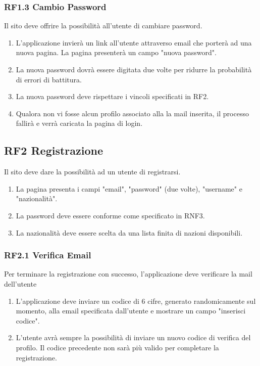 \documentclass{report}
\begin{document}
\subsubsection*{RF1.3 Cambio Password}
Il sito deve offrire la possibilità all’utente di cambiare password.
	\begin{enumerate}
		\item L'applicazione invierà un link all'utente attraverso email che porterà ad una nuova pagina. La pagina presenterà un campo "nuova password".
		
		\item La nuova password dovrà essere digitata due volte per ridurre la probabilità di errori di battitura.
		
		\item La nuova password deve rispettare i vincoli specificati in RF2.
		
		\item Qualora non vi fosse alcun profilo associato alla la mail inserita, il processo fallirà e verrà caricata la pagina di login.
	\end{enumerate}


\subsection*{RF2 Registrazione}
Il sito deve dare la possibilità ad un utente di registrarsi.
\begin{enumerate}
	\item La pagina presenta i campi "email", "password" (due volte), "username" e "nazionalità". 
	\item La password deve essere conforme come specificato in RNF3.
	\item La nazionalità deve essere scelta da una lista finita di nazioni disponibili.
\end{enumerate}

\subsubsection*{RF2.1 Verifica Email}
Per terminare la registrazione con successo, l'applicazione deve verificare la mail dell'utente

\begin{enumerate}
	\item L'applicazione deve inviare un codice di 6 cifre, generato randomicamente sul momento, alla email specificata dall’utente e mostrare un campo "inserisci codice".
		
	\item L’utente avrà sempre la possibilità di inviare un nuovo codice di verifica del profilo. Il codice precedente non sarà più valido per completare la registrazione.
		
\end{enumerate}
\end{document}
